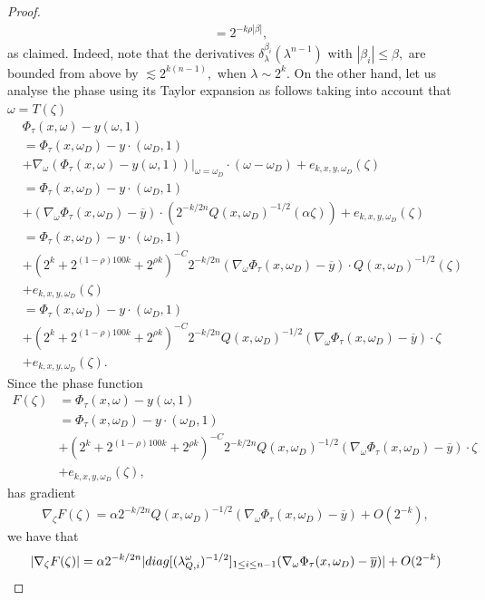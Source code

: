 \documentclass[12pt, reqno]{amsart}
\theoremstyle{definition}
\theoremstyle{remark}
\numberwithin{equation}{section}
\begin{document}
\begin{proof}
\begin{align*}
&=2^{-k\rho|\beta|},
\end{align*}as claimed. Indeed, note that the derivatives $\delta_\lambda^{\beta_{i}}(\lambda^{n-1})$ with $|\beta_i|\leq \beta,$ are bounded from above by $\lesssim 2^{k(n-1)},$ when $\lambda\sim 2^{k}.$
On the other hand, let us analyse the phase using its Taylor expansion as follows taking into account that $\omega=T(\zeta)$ 
\begin{align*}
   & \Phi_\tau(x,\omega)-y(\omega,1) \\
   &= \Phi_\tau(x,\omega_D)-y\cdot(\omega_D,1)\\
    &+\nabla_\omega(\Phi_\tau(x,\omega)-y(\omega,1))|_{\omega=\omega_D}\cdot (\omega-\omega_D)+e_{k,x,y,\omega_D}(\zeta)\\
    &= \Phi_\tau(x,\omega_D)-y\cdot(\omega_D,1)\\
    &+(\nabla_\omega\Phi_\tau(x,\omega_D)-\overline{y})\cdot (2^{-k/2n}Q(x,\omega_D)^{-1/2}(\alpha \zeta))+e_{k,x,y,\omega_D}(\zeta)\\
    &= \Phi_\tau(x,\omega_D)-y\cdot(\omega_D,1)\\
    &+(2^{ k}+2^{(1-\rho)100 k}+2^{\rho k})^{-C}2^{-k/2n}(\nabla_\omega\Phi_\tau(x,\omega_D)-\overline{y})\cdot Q(x,\omega_D)^{-1/2}(\zeta)\\
    &+e_{k,x,y,\omega_D}(\zeta)\\
    &= \Phi_\tau(x,\omega_D)-y\cdot(\omega_D,1)\\
    &+(2^{ k}+2^{(1-\rho)100 k}+2^{\rho k})^{-C}2^{-k/2n}Q(x,\omega_D)^{-1/2}(\nabla_\omega\Phi_\tau(x,\omega_D)-\overline{y})\cdot \zeta\\
    &+e_{k,x,y,\omega_D}(\zeta).
\end{align*}
Since the phase function
\begin{align*} F(\zeta) &= \Phi_\tau(x,\omega)-y(\omega,1)\\
 &= \Phi_\tau(x,\omega_D)-y\cdot(\omega_D,1)\\
    &+(2^{ k}+2^{(1-\rho)100 k}+2^{\rho k})^{-C}2^{-k/2n}Q(x,\omega_D)^{-1/2}(\nabla_\omega\Phi_\tau(x,\omega_D)-\overline{y})\cdot \zeta\\
    &+e_{k,x,y,\omega_D}(\zeta),
\end{align*} has  gradient 
\begin{align*}
    \nabla_{\zeta}F(\zeta)=\alpha 2^{-k/2n}Q(x,\omega_D)^{-1/2}(\nabla_\omega \Phi_\tau(x,\omega_D)-\overline{y})+O(2^{-k}),
\end{align*} we have that
\begin{align*}
    |\nabla_{\zeta}F(\zeta)| &= \alpha 2^{-k/2n}|\textnormal{diag}[(\lambda_{Q,i}^{\omega})^{-1/2}]_{1\leq i\leq n-1}(\nabla_\omega \Phi_\tau(x,\omega_D)-\overline{y})|+O(2^{-k})\\

\end{align*}
\end{proof}
\end{document}
